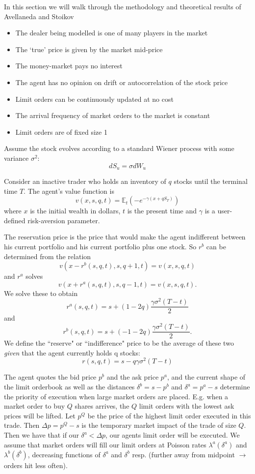 In this section we will walk through the methodology and theoretical
results of Avellaneda and Stoikov \cite{as}

\begin{itemize}
    \item The dealer being modelled is one of many players in the market
    \item The `true' price is given by the market mid-price
    \item The money-market pays no interest
    \item The agent has no opinion on drift or autocorrelation of the stock price
    \item Limit orders can be continuously updated at no cost
    \item The arrival frequency of market orders to the market is constant
    \item Limit orders are of fixed size 1
\end{itemize}

Assume the stock evolves according to a standard Wiener process with some variance $\sigma^2$: 
$$dS_u=\sigma dW_u$$

Consider an inactive trader who holds an inventory of $q$ stocks until the terminal time $T.$ The agent's value function is
$$v(x,s,q,t)=\mathbb{E}_t\left(-e^{-\gamma(x+qS_T)}\right)$$
where $x$ is the initial wealth in dollars, $t$ is the present time and $\gamma$ is a user-defined risk-aversion parameter.

The reservation price is the price that would make the agent indifferent between his current portfolio and his current portfolio plus one stock. So $r^b$ can be determined from the relation
$$v(x-r^b(s,q,t),s,q+1,t)=v(x,s,q,t)$$
and $r^a$ solves
$$v(x+r^a(s,q,t),s,q-1,t)=v(x,s,q,t).$$
We solve these to obtain
$$r^a(s,q,t)=s+(1-2q)\frac{\gamma\sigma^2(T-t)}{2}$$
and
$$r^b(s,q,t)=s+(-1-2q)\frac{\gamma\sigma^2(T-t)}{2}.$$
We define the ``reserve" or ``indifference" price to be the average of these two \textit{given} that the agent currently holds q stocks:
$$r(s,q,t)=s-q\gamma\sigma^2(T-t)$$

The agent quotes the bid price $p^b$ and the ask price $p^a$, and the current shape of the limit orderbook as well as the distances $\delta^b=s-p^b$ and $\delta^a=p^a-s$ determine the priority of execution when large market orders are placed. 
E.g. when a market order to buy $Q$ shares arrives, the $Q$ limit orders with the lowest ask prices will be lifted. 
Let $p^Q$ be the price of the highest limit order executed in this trade. Then $\Delta p=p^Q-s$ is the temporary market impact of the trade of size $Q.$ 
Then we have that if our $\delta^a < \Delta p$, our agents limit order will be executed. We assume that market orders will fill our limit orders at Poisson rates $\lambda^a(\delta^a)$ and $\lambda^b(\delta^b)$, decreasing functions of $\delta^a$ and $\delta^b$ resp. 
(further away from midpoint $\rightarrow$ orders hit less often).

